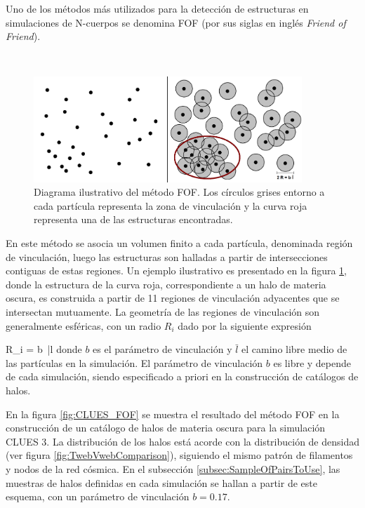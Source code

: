 Uno de los métodos más utilizados para la detección de estructuras en 
simulaciones de N-cuerpos se denomina FOF (por sus siglas en inglés
\textit{Friend of Friend}).

\
\begin{figure}[htbp]
	\centering
	\includegraphics[width=0.9\textwidth]
	{./figures/3_nbody_simulations/FOF_Method.png}

	\caption{\small{Diagrama ilustrativo del método FOF. Los círculos grises
	entorno a cada partícula representa la zona de vinculación y la curva 
	roja representa una de las estructuras encontradas.}}
	
	\label{fig:FOF_Method}
\end{figure}


En este método se asocia un volumen finito a cada partícula, denominada 
región de vinculación, luego las estructuras son halladas a partir de 
intersecciones contiguas de estas regiones. Un ejemplo ilustrativo es 
presentado en la figura \ref{fig:FOF_Method}, donde la estructura de la curva
roja, correspondiente a un halo de materia oscura, es construida a partir
de 11 regiones de vinculación adyacentes que se intersectan mutuamente.
La geometría de las regiones de vinculación son generalmente esféricas, con
un radio $R_i$ dado por la siguiente expresión


{ R_i = b\ \bar l }
donde $b$ es el parámetro de vinculación y $\bar l$ el camino libre medio 
de las partículas en la simulación. El parámetro de vinculación $b$ es libre 
y depende de cada simulación, siendo especificado a priori en la construcción 
de catálogos de halos.


En la figura \ref{fig:CLUES_FOF} se muestra el resultado del método FOF en
la construcción de un catálogo de halos de materia oscura para la simulación
CLUES 3. La distribución de los halos está acorde con la distribución de 
densidad (ver figura \ref{fig:TwebVwebComparison}), siguiendo el mismo patrón
de filamentos y nodos de la red cósmica. En el subsección 
\ref{subsec:SampleOfPairsToUse}, las muestras de halos definidas en cada 
simulación se hallan a partir de este esquema, con un parámetro de 
vinculación $b = 0.17$.



